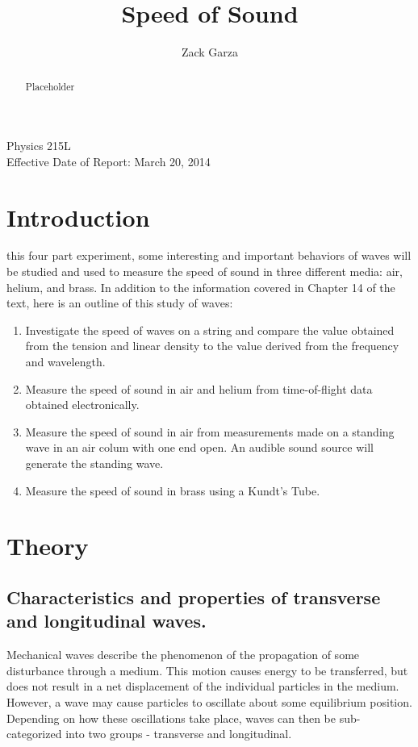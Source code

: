 \documentclass[twocolumn,english]{IEEEtran}
\theoremstyle{plain}
\theoremstyle{plain}
\begin{document}
\title{Speed of Sound}


\author{Zack Garza}


\IEEEspecialpapernotice
{Physics 215L \\
Effective Date of Report: March 20, 2014 }


\maketitle
\begin{abstract}
Placeholder
\end{abstract}
\tableofcontents

\section{Introduction}
 this four part experiment, some interesting and important behaviors of waves will be studied and used to measure the speed of sound in three different media: air, helium, and brass.
In addition to the information covered in Chapter 14 of the text, here is an outline of this study of waves:

\begin{enumerate}
 \item Investigate the speed of waves on a string and compare the value obtained from the tension and linear density to the value derived from the frequency and wavelength.
 \item Measure the speed of sound in air and helium from time-of-flight data obtained electronically.
 \item Measure the speed of sound in air from measurements made on a standing wave in an air colum with one end open.
 An audible sound source will generate the standing wave.
 \item Measure the speed of sound in brass using a Kundt's Tube.
\end{enumerate}

\section{Theory}
\subsection*{Characteristics and properties of transverse and longitudinal waves.}

Mechanical waves describe the phenomenon of the propagation of some disturbance through a medium. This motion causes energy to be transferred, but does not result in a net displacement of the individual particles in the medium. However, a wave may cause particles to oscillate about some equilibrium position. Depending on how these oscillations take place, waves can then be sub-categorized into two groups - transverse and longitudinal.
\end{document}
